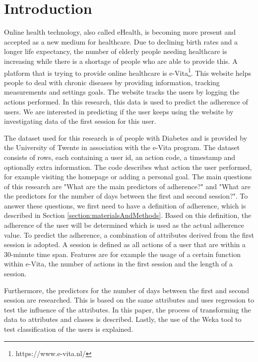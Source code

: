 \section{Introduction}
Online health technology, also called eHealth, is becoming more present and accepted as a new medium for healthcare. Due to declining birth rates and a longer life expectancy, the number of elderly people needing healthcare is increasing while there is a shortage of people who are able to provide this. A platform that is trying to provide online healthcare is e-Vita\footnote{https://www.e-vita.nl/}. This website helps people to deal with chronic diseases by providing information, tracking measurements and settings goals. The website tracks the users by logging the actions performed. In this research, this data is used to predict the adherence of users. We are interested in predicting if the user keeps using the website by investigating data of the first session for this user.

The dataset used for this research is of people with Diabetes and is provided by the University of Twente in association with the e-Vita program. The dataset consists of rows, each containing a user id, an action code, a timestamp and optionally extra information. The code describes what action the user performed, for example visiting the homepage or adding a personal goal. The main questions of this research are "What are the main predictors of adherence?" and "What are the predictors for the number of days between the first and second session?". To answer these questions, we first need to have a definition of adherence, which is described in Section \ref{section:materialsAndMethods}. Based on this definition, the adherence of the user will be determined which is used as the actual adherence value. To predict the adherence, a combination of attributes derived from the first session is adopted. A session is defined as all actions of a user that are within a 30-minute time span. Features are for example the usage of a certain function within e-Vita, the number of actions in the first session and the length of a session.

Furthermore, the predictors for the number of days between the first and second session are researched. This is based on the same attributes and uses regression to test the influence of the attributes. In this paper, the process of transforming the data to attributes and classes is described. Lastly, the use of the Weka \cite{weka} tool to test classification of the users is explained.